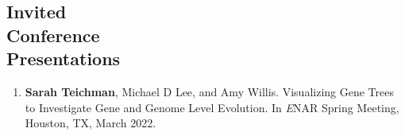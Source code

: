 \documentclass[margin,centered]{res}
\begin{document}
\begin{resume}









\section{\sc Invited\\ Conference\\ Presentations}
\begin{enumerate}[leftmargin=*]
\item {\bf Sarah Teichman}, Michael D Lee, and Amy Willis. Visualizing Gene Trees to Investigate Gene and Genome Level Evolution. In {\emph ENAR Spring Meeting}, Houston, TX, March 2022. 
\end{enumerate}


\end{resume}
\end{document}

